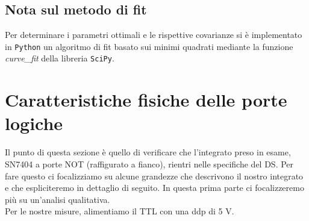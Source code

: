 \documentclass[10pt, a4paper, italian]{article}
\begin{document}
\subsection*{Nota sul metodo di fit}
Per determinare i parametri ottimali e le rispettive covarianze si \`e
implementato in \verb+Python+ un algoritmo di fit basato sui minimi quadrati
mediante la funzione \emph{curve\_fit} della libreria \texttt{SciPy}.

\section{Caratteristiche fisiche delle porte logiche}
\begin{minipage}{0.7\textwidth}
    Il punto di questa sezione è quello di verificare che l'integrato preso in esame, SN7404 a porte NOT (raffigurato a fianco), rientri nelle specifiche del DS. Per fare questo ci focalizziamo su alcune grandezze che descrivono il nostro integrato e che espliciteremo in dettaglio di seguito. In questa prima parte ci focalizzeremo più su un'analisi qualitativa.\\
    Per le nostre misure, alimentiamo il TTL con una ddp di 5 V.
\end{minipage}
\begin{minipage}{0.3\textwidth}
    \label{NOT}
\end{minipage}
\end{document}
